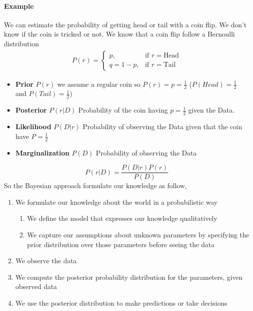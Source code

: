 \documentclass[main.tex]{subfiles}
\begin{document}
\paragraph{Example} We can estimate the probability of getting head or tail with a coin flip. We don't know if the coin is tricked or not.
We know that a coin flip follow a Bernoulli distribution
\begin{align*}
    P(r)= 
    \begin{cases}
        p,& \text{if } r = \text{Head}\\
        q=1-p,& \text{if } r = \text{Tail}
    \end{cases}
\end{align*}
\begin{itemize}
    \item \textbf{Prior} $P(r)$ we assume a regular coin so $P(r) = p = \frac{1}{2}$ ($P(Head)=\frac{1}{2}$ and $P(Tail)=\frac{1}{2}$)
    \item \textbf{Posterior} $P(r|D)$ Probability of the coin having $p=\frac{1}{2}$ given the Data.
    \item \textbf{Likelihood} $P(D|r)$ Probability of observing the Data given that the coin have $P=\frac{1}{2}$
    \item \textbf{Marginalization} $P(D)$ Probability of observing the Data
\end{itemize}
\begin{equation*}
    P(r|D) = \frac{P(D|r)P(r)}{P(D)}
\end{equation*}
So the Bayesian approach formulate our knowledge as follow,
\begin{enumerate}
    \item We formulate our knowledge about the world in a probabilistic way
    \begin{enumerate}
        \item We define the model that expresses our knowledge qualitatively
        \item We capture our assumptions about unknown parameters by specifying the
prior distribution over those parameters before seeing the data
    \end{enumerate}
    \item We observe the data
    \item We compute the posterior probability distribution for the parameters, given observed data
    \item We use the posterior distribution to make predictions or take decisions
\end{enumerate}
\end{document}
